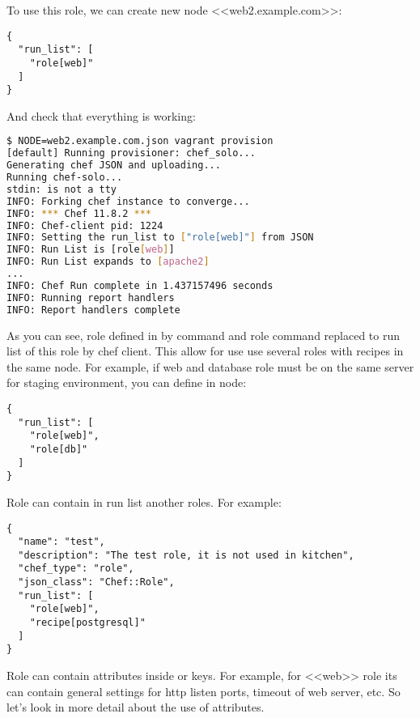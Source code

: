 To use this role, we can create new node <<web2.example.com>>:

\begin{lstlisting}[label=lst:my-cloud-role2,title=my-cloud/nodes/web2.example.com.json]
{
  "run_list": [
    "role[web]"
  ]
}
\end{lstlisting}

And check that everything is working:

\begin{lstlisting}[language=Bash,label=lst:my-cloud-role3]
$ NODE=web2.example.com.json vagrant provision
[default] Running provisioner: chef_solo...
Generating chef JSON and uploading...
Running chef-solo...
stdin: is not a tty
INFO: Forking chef instance to converge...
INFO: *** Chef 11.8.2 ***
INFO: Chef-client pid: 1224
INFO: Setting the run_list to ["role[web]"] from JSON
INFO: Run List is [role[web]]
INFO: Run List expands to [apache2]
...
INFO: Chef Run complete in 1.437157496 seconds
INFO: Running report handlers
INFO: Report handlers complete
\end{lstlisting}

As you can see, role defined in  by command  and role command replaced to run list of this role by chef client. This allow for use use several roles with recipes in the same node. For example, if web and database role must be on the same server for staging environment, you can define in node:

\begin{lstlisting}[label=lst:my-cloud-role4,title=my-cloud/nodes/web2.example.com.json]
{
  "run_list": [
    "role[web]",
    "role[db]"
  ]
}
\end{lstlisting}

Role can contain in run list another roles. For example:

\begin{lstlisting}[label=lst:my-cloud-role5,title=my-cloud/roles/test.json]
{
  "name": "test",
  "description": "The test role, it is not used in kitchen",
  "chef_type": "role",
  "json_class": "Chef::Role",
  "run_list": [
    "role[web]",
    "recipe[postgresql]"
  ]
}
\end{lstlisting}

Role can contain attributes inside  or  keys. For example, for <<web>> role its can contain general settings for http listen ports, timeout of web server, etc. So let's look in more detail about the use of attributes.
